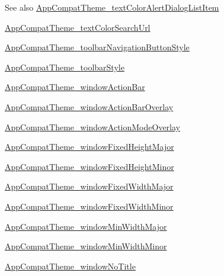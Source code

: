 \begin{DoxySeeAlso}{See also}
\hyperlink{classandroid_1_1support_1_1design_1_1R_1_1styleable_abc7c2b20a8ab2fd4ce11d97bc2dcf36e}{App\+Compat\+Theme\+\_\+text\+Color\+Alert\+Dialog\+List\+Item} 

\hyperlink{classandroid_1_1support_1_1design_1_1R_1_1styleable_aafa1ab7dc0cc5540f3c561bc2dcdb146}{App\+Compat\+Theme\+\_\+text\+Color\+Search\+Url} 

\hyperlink{classandroid_1_1support_1_1design_1_1R_1_1styleable_af3d0203e79964854fe14861e072e6ff3}{App\+Compat\+Theme\+\_\+toolbar\+Navigation\+Button\+Style} 

\hyperlink{classandroid_1_1support_1_1design_1_1R_1_1styleable_aee082e81065a0dcd55b2dac5cf28624e}{App\+Compat\+Theme\+\_\+toolbar\+Style} 

\hyperlink{classandroid_1_1support_1_1design_1_1R_1_1styleable_af0d7fc989412d347b42efaf6e07fb775}{App\+Compat\+Theme\+\_\+window\+Action\+Bar} 

\hyperlink{classandroid_1_1support_1_1design_1_1R_1_1styleable_a8ea8126eeb9bb872aeb7fdb94d4a4db9}{App\+Compat\+Theme\+\_\+window\+Action\+Bar\+Overlay} 

\hyperlink{classandroid_1_1support_1_1design_1_1R_1_1styleable_add8f8ab4f925ac3f15d7337d40a9ecd8}{App\+Compat\+Theme\+\_\+window\+Action\+Mode\+Overlay} 

\hyperlink{classandroid_1_1support_1_1design_1_1R_1_1styleable_adda8a0798f30bcf0b35dc5ca9c4e570a}{App\+Compat\+Theme\+\_\+window\+Fixed\+Height\+Major} 

\hyperlink{classandroid_1_1support_1_1design_1_1R_1_1styleable_a772ad7624fd50e19bc24adae7d61f335}{App\+Compat\+Theme\+\_\+window\+Fixed\+Height\+Minor} 

\hyperlink{classandroid_1_1support_1_1design_1_1R_1_1styleable_ab12b360d277ad1c88a3ee93ff645a047}{App\+Compat\+Theme\+\_\+window\+Fixed\+Width\+Major} 

\hyperlink{classandroid_1_1support_1_1design_1_1R_1_1styleable_ab0a6460ce03febb5815a97617555e4ac}{App\+Compat\+Theme\+\_\+window\+Fixed\+Width\+Minor} 

\hyperlink{classandroid_1_1support_1_1design_1_1R_1_1styleable_a15a4daeba04d2f8277a443992fa1d153}{App\+Compat\+Theme\+\_\+window\+Min\+Width\+Major} 

\hyperlink{classandroid_1_1support_1_1design_1_1R_1_1styleable_a021b9cf9e84f6d782b685e0d9a05866a}{App\+Compat\+Theme\+\_\+window\+Min\+Width\+Minor} 

\hyperlink{classandroid_1_1support_1_1design_1_1R_1_1styleable_a81be05150eed15a8c4c447e2e4871635}{App\+Compat\+Theme\+\_\+window\+No\+Title} 
\end{DoxySeeAlso}
\mbox{\label{classandroid_1_1support_1_1design_1_1R_1_1styleable_a114c1b92963957310f5ba215a1c81a77}} 
